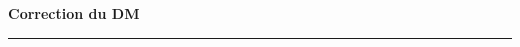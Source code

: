\documentclass[11pt,a4paper]{article}
\title{}
\date{}
\newcommand{\HRule}{\rule{\linewidth}{0.5mm}}
\begin{document}
\pagestyle{fancy}

\fancyhead{}
 \fancyfoot{}


\newcommand{\lb}{\llbracket}
\newcommand{\rb}{\rrbracket}




\newcommand{\md}[3]{#1\ \equiv \ #2 \! \! \! \! \! \pmod {#3} }
\newcommand{\nmd}[3]{#1 \not \equiv #2 \! \! \! \! \!  \pmod {#3} }
\newcommand{\mda}[3]{#1 \equiv #2   [{#3}] }
\newcommand{\nmda}[3]{#1 \not \equiv #2 \! \! \pmod {#3} }
\newcommand{\mo}[2]{#1 \! \! \! \! \! \pmod #2 }
\newcommand{\moa}[2]{#1 \! \!  \pmod {#2} }

\thispagestyle{fancy}

\begin{center}
    { \huge \bfseries
Correction du DM %
     \\ [0cm] }
    \HRule \\[0.5cm]
\end{center}





\
\end{document}
